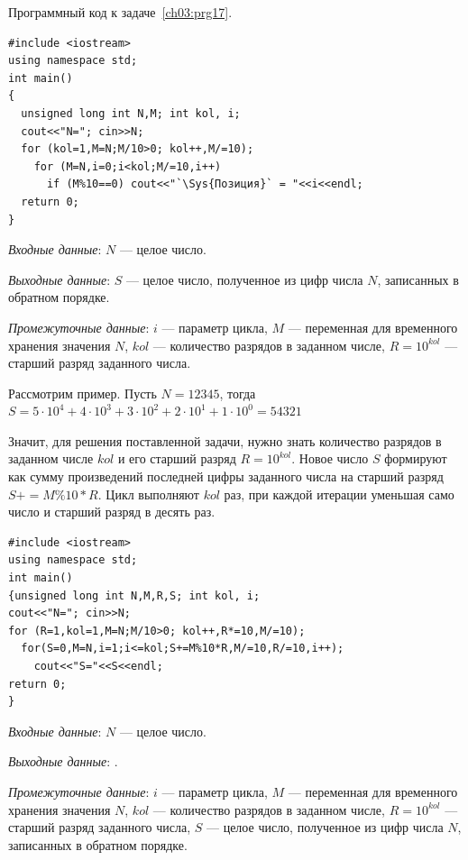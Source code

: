 Программный код к задаче~\ref{ch03:prg17}.
\begin{lstlisting}
#include <iostream>
using namespace std;
int main()
{
  unsigned long int N,M; int kol, i;
  cout<<"N="; cin>>N;
  for (kol=1,M=N;M/10>0; kol++,M/=10);
    for (M=N,i=0;i<kol;M/=10,i++)
      if (M%10==0) cout<<"`\Sys{Позиция}` = "<<i<<endl;
  return 0;
}
\end{lstlisting}


\emph{Входные данные}: $N$ --- целое число.

\emph{Выходные данные}: $S$ --- целое число, полученное из цифр числа $N$, записанных в обратном порядке.

\emph{Промежуточные данные}: $i$ --- параметр цикла, $M$ --- переменная для
временного хранения значения $N$, $kol$ --- количество разрядов в заданном числе, 
$R=10^{kol}$ --- старший разряд заданного числа.

Рассмотрим пример. Пусть $N=12345$, тогда 
$S=5\cdot 10^4+4\cdot 10^3+3\cdot 10^2+2\cdot 10^1+1\cdot 10^0=54321$

Значит, для решения поставленной задачи, нужно знать количество
разрядов в заданном числе $kol$ и его старший разряд $R=10^{kol}$.
Новое число $S$ формируют как сумму произведений
последней цифры заданного числа на старший разряд $S+=M\%10*R$. Цикл выполняют
$kol$ раз, при каждой итерации уменьшая само число и старший разряд в десять раз.
\begin{lstlisting}
#include <iostream>
using namespace std;
int main()
{unsigned long int N,M,R,S; int kol, i;
cout<<"N="; cin>>N;
for (R=1,kol=1,M=N;M/10>0; kol++,R*=10,M/=10);
  for(S=0,M=N,i=1;i<=kol;S+=M%10*R,M/=10,R/=10,i++);
    cout<<"S="<<S<<endl;
return 0;
}
\end{lstlisting}

%

\emph{Входные данные}: $N$ --- целое число.

\emph{Выходные данные}: . 

\emph{Промежуточные данные}: $i$ --- параметр цикла, $M$ --- переменная для
временного хранения значения $N$, $kol$ --- количество разрядов в заданном числе,
$R=10^{kol}$ --- старший разряд заданного числа, $S$ --- целое число, полученное 
из цифр числа $N$, записанных в обратном порядке.

